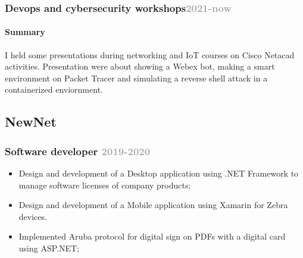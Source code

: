 \documentclass[11pt,a4paper]{article}
\begin{document}
  \subsubsection{Devops and cybersecurity workshops\hfill \textcolor{darkgray}{\small{2021-now}}}

  \paragraph{Summary}I held some presentations during networking and IoT courses on Cisco Netacad activities. Presentation were about showing a Webex bot, making a smart environment on Packet Tracer and simulating a reverse shell attack in a containerized enviornment.
  \subsection{NewNet}
  \subsubsection{Software developer \hfill \textcolor{darkgray}{\small{2019-2020}}}
  \begin{itemize}
    \item Design and development of a Desktop application using .NET Framework to manage software licenses of company products;
    \item Design and development of a Mobile application using Xamarin for Zebra devices.
    \item Implemented Aruba protocol for digital sign on PDFs with a digital card using ASP.NET;
  \end{itemize}
\end{document}
